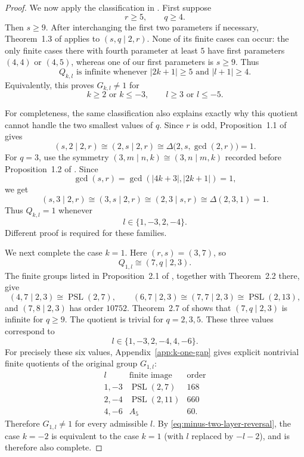 \documentclass{article}
\begin{document}
\begin{proof}
We now apply the classification in \cite{ET}.  First suppose
\[
 r\ge5,\qquad q\ge4.
\]
Then \(s\ge9\).  After interchanging the first two parameters if
necessary, Theorem~1.3 of \cite{ET} applies to \((s,q\mid2,r)\).  None of
its finite cases can occur: the only finite cases there with fourth
parameter at least \(5\) have first parameters \((4,4)\) or \((4,5)\),
whereas one of our first parameters is \(s\ge9\).  Thus
\[
 Q_{k,l}\text{ is infinite whenever }
 |2k+1|\ge5\text{ and }|l+1|\ge4.
\]
Equivalently, this proves \(G_{k,l}\neq1\) for
\[
 k\ge2\text{ or }k\le-3,
 \qquad l\ge3\text{ or }l\le-5.
\]

For completeness, the same classification also explains exactly why this
quotient cannot handle the two smallest values of \(q\).  Since \(r\) is
odd, Proposition~1.1 of \cite{ET} gives
\[
 (s,2\mid2,r)\cong(2,s\mid2,r)
 \cong\Delta\bigl(2,s,\gcd(2,r)\bigr)=1.
\]
For \(q=3\), use the symmetry
\((3,m\mid n,k)\cong(3,n\mid m,k)\) recorded before
Proposition~1.2 of \cite{ET}.  Since
\[
 \gcd(s,r)=\gcd(|4k+3|,|2k+1|)=1,
\]
we get
\[
 (s,3\mid2,r)\cong(3,s\mid2,r)
 \cong(2,3\mid s,r)
 \cong\Delta(2,3,1)=1.
\]
Thus \(Q_{k,l}=1\) whenever
\[
 l\in\{1,-3,2,-4\}.
\]
Different proof is required for these
families.

We next complete the case $k=1$.  Here $(r,s)=(3,7)$, so
\[
 Q_{1,l}\cong(7,q\mid2,3).
\]
The finite groups listed in Proposition~2.1 of \cite{ET}, together with
Theorem~2.2 there, give
\[
(4,7\mid2,3)\cong\operatorname{PSL}(2,7),\qquad
(6,7\mid2,3)\cong(7,7\mid2,3)\cong\operatorname{PSL}(2,13),
\]
and $(7,8\mid2,3)$ has order $10752$.  Theorem~2.7 of \cite{ET}
shows that $(7,q\mid2,3)$ is infinite for $q\ge9$.  The quotient is
trivial for $q=2,3,5$.  These three values correspond to
\[
 l\in\{1,-3,2,-4,4,-6\}.
\]
For precisely these six values, Appendix~\ref{app:k-one-gap} gives
explicit nontrivial finite quotients of the original group $G_{1,l}$:
\[
\begin{array}{c|c|c}
 l & \text{finite image} & \text{order}\\ \hline
 1,-3 & \operatorname{PSL}(2,7) & 168\\
 2,-4 & \operatorname{PSL}(2,11) & 660\\
 4,-6 & A_5 & 60.
\end{array}
\]
Therefore $G_{1,l}\neq1$ for every admissible $l$.  By
\eqref{eq:minus-two-layer-reversal}, the case $k=-2$ is equivalent to the
case $k=1$ (with $l$ replaced by $-l-2$), and is therefore also complete.


\end{proof}
\end{document}
